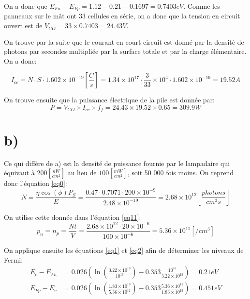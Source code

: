 On a donc que $E_{Fn} - E_{Fp} = 1.12 - 0.21 - 0.1697 = 0.7403eV$. Comme les panneaux sur le mât ont 33 cellules en série, on a donc que la tension en circuit ouvert est de $V_{CO} = 33\times 0.7403 = 24.43 V$.

On trouve par la suite que le courant en court-circuit est donné par la densité de photons par secondes multipliée par la surface totale et par la charge élémentaire. On a donc: 

\begin{equation}
I_{cc} = N\cdot S \cdot 1.602\times 10^{-19} \left[\frac{C}{s}\right] = 1.34 \times 10^{17} \cdot \frac{3}{33}\times 10^4 \cdot  1.602\times 10^{-19} = 19.52A
\end{equation}

On trouve ensuite que la puissance électrique de la pile est donnée par:
\begin{equation}
P = V_{CO} \times I_{cc} \times f_f =  24.43 \times 19.52 \times 0.65 = 309.9W
\end{equation}

\section{b)}
Ce qui diffère de a) est la densité de puissance fournie par le lampadaire qui équivaut à $200\left[\frac{nW}{cm^2}\right]$ au lieu de $100\left[\frac{mW}{cm^2}\right]$, soit 50 000 fois moins. On reprend donc l'équation \ref{eq0}:
\begin{equation}
N = \frac{\eta \cos(\phi)P_S}{E} = \frac{0.47 \cdot 0.7071 \cdot 200\times 10^{-9}}{2.48 \times 10^{-19}} = 2.68\times 10^{12} \left[\frac{photons}{cm^3 s }\right]
\end{equation}

On utilise cette donnée dans l'équation \ref{eq11}:
\begin{equation}
p_n = n_p = \frac{N t}{V} = \frac{2.68\times 10^{12} \cdot 20 \times 10^{-6} }{100 \times 10^{-6}} = 5.36 \times 10^{11}\left[/cm^3\right]
\end{equation}

On applique ensuite les équations \ref{eq1} et \ref{eq2} afin de déterminer les niveaux de Fermi:
\begin{align}
E_{c} - E_{Fn} &= 0.026\left(\ln\left(\frac{3.22\times 10^{19}}{10^{16}}\right) - 0.353 \frac{10^{16}}{3.22\times 10^{19}}\right) = 0.21eV\\
E_{Fp} - E_v   &= 0.026\left(\ln\left(\frac{1.83\times 10^{19}}{5.36 \times 10^{11}}\right) - 0.353 \frac{5.36 \times 10^{11}}{1.83\times 10^{19}}\right) = 0.451eV
\end{align}

